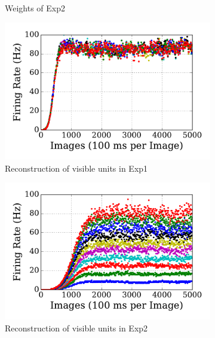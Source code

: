 \begin{figure}
\begin{subfigure}[t]{0.48\textwidth}
		\caption{Weights of Exp2}
	\end{subfigure}
	\begin{subfigure}[t]{0.48\textwidth}
		\includegraphics[width=\textwidth]{pics_sdlm/05_exp_SAE_teach_long/exp1_recon_s.pdf}
		\caption{Reconstruction of visible units in Exp1}
	\end{subfigure}
	\begin{subfigure}[t]{0.48\textwidth}
		\includegraphics[width=\textwidth]{pics_sdlm/05_exp_SAE_teach_long/exp2_recon_s.pdf}
		\caption{Reconstruction of visible units in Exp2}
	\end{subfigure}\\
	\begin{subfigure}[t]{0.48\textwidth}

\end{subfigure}
\end{figure}
